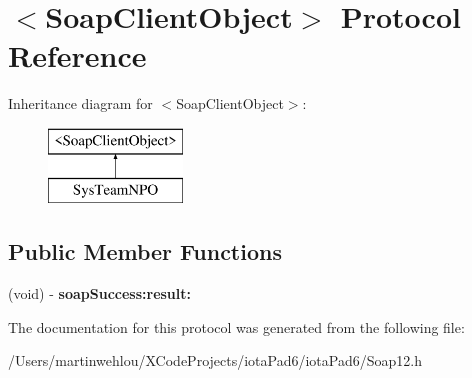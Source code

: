 \hypertarget{protocol_soap_client_object-p}{
\section{$<$SoapClientObject$>$ Protocol Reference}
\label{protocol_soap_client_object-p}
}
Inheritance diagram for $<$SoapClientObject$>$:\begin{figure}[H]
\begin{center}
\leavevmode
\includegraphics[height=2.000000cm]{protocol_soap_client_object-p}
\end{center}
\end{figure}
\subsection*{Public Member Functions}
\begin{DoxyCompactItemize}
\item 
\hypertarget{protocol_soap_client_object-p_a00fd45a85768db4e5531d22739eb9ee8}{
(void) -\/ {\bfseries soapSuccess:result:}}
\label{protocol_soap_client_object-p_a00fd45a85768db4e5531d22739eb9ee8}

\end{DoxyCompactItemize}


The documentation for this protocol was generated from the following file:\begin{DoxyCompactItemize}
\item 
/Users/martinwehlou/XCodeProjects/iotaPad6/iotaPad6/Soap12.h\end{DoxyCompactItemize}
